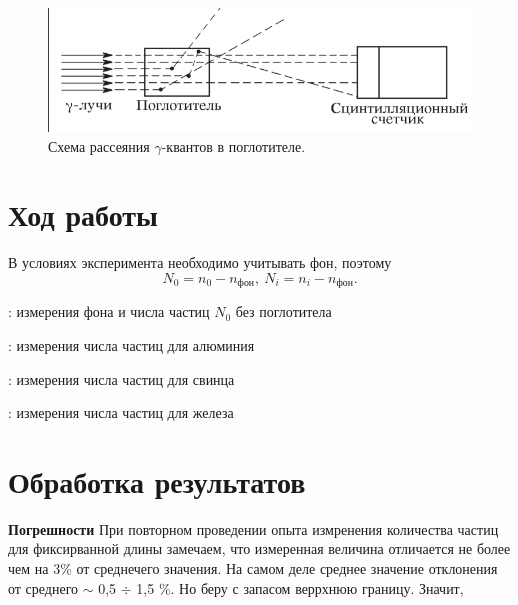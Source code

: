 	\begin{figure}[h!]
		\centering
		\includegraphics[width=0.8\linewidth]{pics/part_disp.png}
		\caption{Схема рассеяния $\gamma$-квантов в поглотителе.}
		\label{}
	\end{figure}  

	\newpage
	
	\section{Ход работы}

	В условиях эксперимента необходимо учитывать фон, поэтому
	\begin{equation}
		N_0 = n_0 - n_\text{фон}, \ N_i = n_i - n_\text{фон}.
	\end{equation}
	
	\begin{table}[h!]
		\centering
		
		\caption{: измерения фона и числа частиц $N_0$ без поглотитела}
	\label{tb0}
	\end{table}

	\begin{table}[h!]
		\centering
		
		\caption{: измерения числа частиц для алюминия}
	\label{tb0_5}
	\end{table}


	\begin{table}[h!]
		\centering
		
		\caption{: измерения числа частиц для свинца}
	\label{tb1_5}
	\end{table}

	

	\begin{table}[h!]
		\centering
		
		\caption{: измерения числа частиц для железа}
	\label{tb2_5}
	\end{table}

	\newpage
	\section{Обработка результатов}

	\textbf{Погрешности}
	При повторном проведении опыта измренения количества частиц для фиксирванной длины замечаем, что измеренная величина отличается не более чем на 3\% от среднечего значения. 
	На самом деле среднее значение отклонения от среднего $\sim$ 0,5 $\div$ 1,5 \%. Но беру с запасом веррхнюю границу. Значит, 
	
